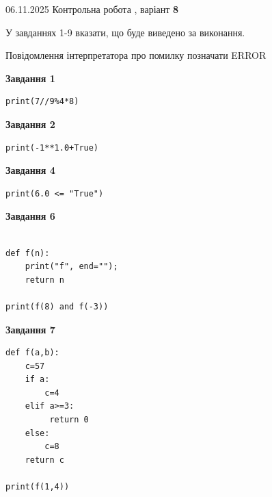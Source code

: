 \documentclass[12pt, ukrainian]{article}
\begin{document}
{\Large{06.11.2025 Контрольна робота , варіант  \No \textbf { 8 }\par}}
{
\begin {large}
У завданнях 1-9 вказати, що буде виведено за виконання.

Повідомлення інтерпретатора про помилку позначати ERROR

\begin{minipage}[t]{7.5cm}

\begin{center}
\textbf{Завдання 1}
\end{center}

\begin{verbatim}
print(7//9%4*8)
\end{verbatim}



\begin{center}
\textbf{Завдання 2}
\end{center}

\begin{verbatim}
print(-1**1.0+True)
\end{verbatim}



\begin{center}
\textbf{Завдання 4}
\end{center}

\begin{verbatim}
print(6.0 <= "True")
\end{verbatim}



\begin{center}
\textbf{Завдання 6}
\end{center}

\begin{verbatim}

def f(n):
    print("f", end="");
    return n

print(f(8) and f(-3))
\end{verbatim}



\begin{center}
\textbf{Завдання 7}
\end{center}

\begin{verbatim}
def f(a,b):
    c=57
    if a:
        c=4
    elif a>=3:
         return 0
    else: 
        c=8
    return c

print(f(1,4))
\end{verbatim}


\end{minipage}
\end{large}}
\end{document}
